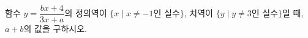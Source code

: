 함수 $y=\dfrac{bx+4}{3x+a}$의 정의역이 $\{x \mid x\ne -1$인 실수$\}$, 치역이 $\{y \mid y\ne 3$인 실수$\}$일 때, $a+b$의 값을 구하시오. 
